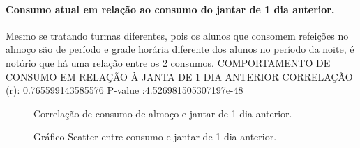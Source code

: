 \documentclass[	12pt, Times, openright, twoside, a4paper, english, brazil]{abntex2}
\begin{document}
                \paragraph{Consumo atual em relação ao consumo do jantar de 1 dia anterior.}
                    Mesmo se tratando turmas diferentes, pois os alunos que consomem refeições no almoço são de período e grade horária diferente dos alunos no período da noite, é notório que há uma relação entre os 2 consumos.\newline
                    COMPORTAMENTO DE CONSUMO EM RELAÇÃO À JANTA DE 1 DIA ANTERIOR\newline
                    CORRELAÇÃO (r): 0.765599143585576\newline
                    P-value :4.526981505307197e-48\newline
                    \begin{figure}[!ht]
                	\caption{Correlação de consumo de almoço e jantar de 1 dia anterior. \label{fig:case1_consumo_jantar} }
                    \end{figure}
                    \begin{figure}[!ht]
                    	\caption{Gráfico Scatter entre consumo e jantar de 1 dia anterior. \label{fig:case1_consumo_jantar_scatter} }
                    \end{figure}
\end{document}
